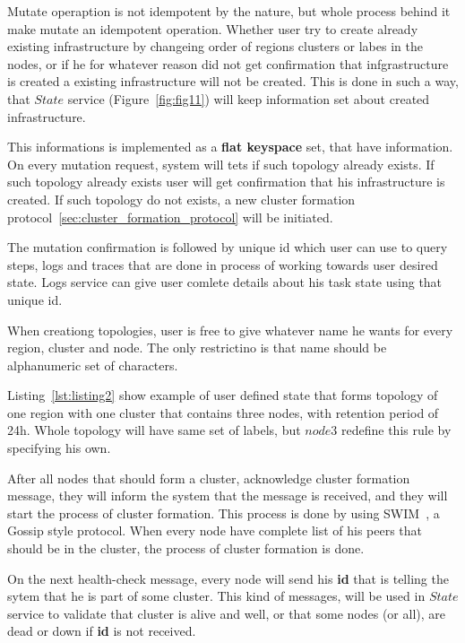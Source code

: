 Mutate operaption is not idempotent by the nature, but whole process behind it make mutate an idempotent operation. Whether user try to create already existing infrastructure by changeing order of regions clusters or labes in the nodes, or if he for whatever reason did not get confirmation that infgrastructure is created a existing infrastructure will not be created. This is done in such a way, that $State$ service (Figure~\ref{fig:fig11}) will keep information set about created infrastructure. 

This informations is implemented as a \textbf{flat keyspace} set, that have information. On every mutation request, system will tets if such topology already exists. If such topology already exists user will get confirmation that his infrastructure is created. If such topology do not exists, a new cluster formation protocol~\ref{sec:cluster_formation_protocol} will be initiated.

The mutation confirmation is followed by unique id which user can use to query steps, logs and traces that are done in process of working towards user desired state. Logs service can give user comlete details about his task state using that unique id.

When creationg topologies, user is free to give whatever name he wants for every region, cluster and node. The only restrictino is that name should be alphanumeric set of characters.

Listing~\ref{lst:listing2} show example of user defined state that forms topology of one region with one cluster that contains three nodes, with retention period of 24h. Whole topology will have same set of labels, but $node3$ redefine this rule by specifying his own.



After all nodes that should form a cluster, acknowledge cluster formation message, they will inform the system that the message is received, and they will start the process of cluster formation. This process is done by using SWIM~\cite{DasGM02}, a Gossip style protocol. When every node have complete list of his peers that should be in the cluster, the process of cluster formation is done. 

On the next health-check message, every node will send his \textbf{id} that is telling the sytem that he is part of some cluster. This kind of messages, will be used in $State$ service to validate that cluster is alive and well, or that some nodes (or all), are dead or down if \textbf{id} is not received. 

